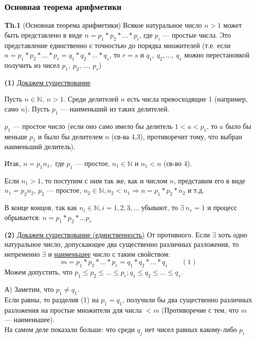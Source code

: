 \documentclass{article}
\begin{document}
  \subsubsection{Основная теорема арифметики}
  \textbf{Th.1} (Основная теорема арифметики) Всякое натуральное число \( n > 1 \) может быть представлено в виде \( n = p_1*p_2* ... *p_i \), где \( p_i \) --- простые числа. Это представление единственно с точностью до порядка множителей (т.е. если \( n = p_1*p_2*...*p_r = q_1*q_2*...*q_s \), то \( r = s \) и \(q_1,\ q_2,...,\ q_s \) можно перестановкой получить из чисел \( p_1,\ p_2,...,\ p_r \))

  \textbf{(1)} \underline{Докажем существование} 

  Пусть \(n \in \mathbb{N},\ n > 1 \). Среди делителей \( n \) есть числа превосходящие 1 (например, само \( n \)). Пусть \( p_1 \) --- наименьший из таких делителей.

  \( p_1 \) --- простое число (если оно само имело бы делитель \( 1 < a < p_1 \), то \( a \) было бы меньше \( p_1 \) и было бы делителем \( n \) (св-ва 4,3), противоречит тому, что выбран наименьший делитель).

  Итак, \( n = p_1n_1, \textrm{ где } p_1 \textrm{ --- простое, } n_1 \in \mathbb{N} \textrm{ и } n_1 < n \) (св-во 4).

  Если \( n_1 > 1 \), то поступим с ним так же, как и числом \( n \), представим его в виде \( n_1 = p_2n_2 \), \( p_2 \) --- простое, \( n_2 \in \mathbb{N}, n_2 < n_1 \Rightarrow n = p_1*p_2*n_2 \) и т.д.

  В конце концов, так как \( n_i \in \mathbb{N}, i=1,2,3,... \) убывают, то \( \exists\ n_r = 1 \) и процесс обрывается: \( n=p_1*p_2*...p_r \)

  \textbf{(2)} \underline{Докажем существование (единственность)}
  От противного. Если \( \exists \) хоть одно натуральное число, допускающее два существенно различных разложения, то непременно \( \exists \) и \underline{наименьшее} число с таким свойством: \[ m = p_1*p_2*...*p_r = q_1*q_2*...*q_s \qquad (1) \]
  Можем допустить, что \( p_1 \leq p_2 \leq ... \leq p_r; q_1 \leq q_2 \leq ... \leq q_s \).

  А) Заметим, что \( p_1 \neq q_1 \).\\
  Если равны, то разделив (1) на \( p_1 = q_1 \), получили бы два существенно различных разложения на простые множители для числа \( < m \) (Противоречие с тем, что \( m \) --- наименьшее).\\
  На самом деле показали больше: что среди \( q_j \) нет чисел равных какому-либо \( p_i \)
\end{document}
